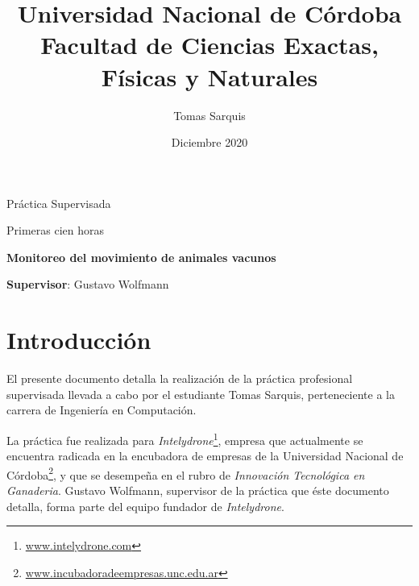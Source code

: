 \documentclass{article}
\title{Universidad Nacional de Córdoba\\Facultad de Ciencias Exactas, Físicas y Naturales}
\author{Tomas Sarquis}
\date{Diciembre 2020}
\newcommand{ \fnintelydrone }{\footnote{\url{www.intelydrone.com}}}
\newcommand{ \fnincubadora }{\footnote{\url{www.incubadoradeempresas.unc.edu.ar}}}
\begin{document}

    \begin{titlingpage}
        \maketitle
        \null \null \null \null 
        
        \begin{center}
            {\huge Práctica Supervisada}
        \end{center}
        
        \begin{center}
            {\huge Primeras cien horas}
        \end{center}
        
        
        \null \null \null \null 
        
        \begin{center}
            {\large \textbf{Monitoreo del movimiento de animales vacunos}}
        \end{center}
        
        \begin{center}
            {\large \textbf{Supervisor}: Gustavo Wolfmann }
        \end{center}

    \end{titlingpage}


    \tableofcontents 


    \newpage
    \section{Introducción}

    El presente documento detalla la realización de la práctica profesional
    supervisada llevada a cabo por el estudiante Tomas Sarquis, perteneciente 
    a la carrera de Ingeniería en Computación. \par

    La práctica fue realizada para \emph{Intelydrone}\fnintelydrone, empresa 
    que actualmente se encuentra radicada en la encubadora de empresas de la 
    Universidad Nacional de Córdoba\fnincubadora, y que se desempeña en el 
    rubro de \emph{Innovación Tecnológica en Ganaderia}. Gustavo Wolfmann,
    supervisor de la práctica que éste documento detalla, forma parte del 
    equipo fundador de \emph{Intelydrone}. \par
\end{document}
